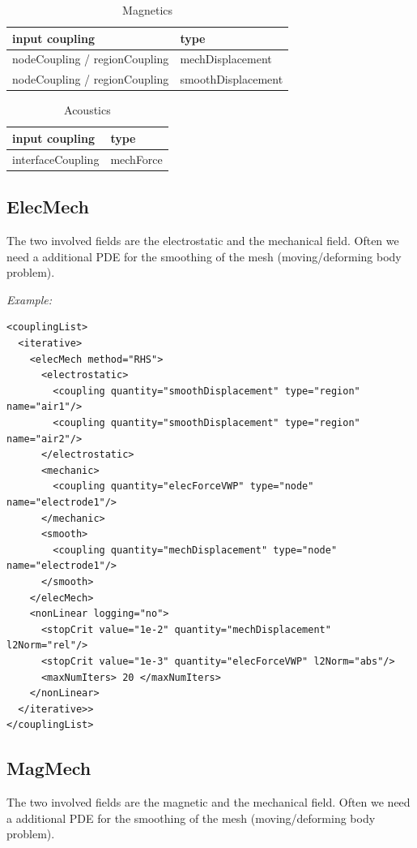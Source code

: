 \begin{table}[htb]
\begin{center}
\caption{Magnetics}
\bigskip
\begin{tabular}{l|l}
input coupling    & type \\\hline \hline
nodeCoupling / regionCoupling & mechDisplacement \\
nodeCoupling / regionCoupling & smoothDisplacement 
\end{tabular}
\end{center}
\end{table}

\begin{table}[htb]
\begin{center}
\caption{Acoustics}
\bigskip
\begin{tabular}{l|l}
input coupling    & type \\\hline \hline
interfaceCoupling      & mechForce \\
\end{tabular}
\end{center}
\end{table}

\subsection{ElecMech}
The two involved fields are the electrostatic and the mechanical field.
Often we need a additional PDE for the smoothing of the mesh (moving/deforming 
body problem).

\bigskip
\noindent
{\it Example:}

\begin{verbatim}
<couplingList>
  <iterative>
    <elecMech method="RHS">
      <electrostatic>
        <coupling quantity="smoothDisplacement" type="region" name="air1"/>
        <coupling quantity="smoothDisplacement" type="region" name="air2"/>
      </electrostatic>
      <mechanic>
        <coupling quantity="elecForceVWP" type="node" name="electrode1"/>
      </mechanic>
      <smooth>
        <coupling quantity="mechDisplacement" type="node" name="electrode1"/>
      </smooth>
    </elecMech>
    <nonLinear logging="no">
      <stopCrit value="1e-2" quantity="mechDisplacement" l2Norm="rel"/>
      <stopCrit value="1e-3" quantity="elecForceVWP" l2Norm="abs"/>
      <maxNumIters> 20 </maxNumIters>
    </nonLinear>
  </iterative>>
</couplingList>
\end{verbatim}

\subsection{MagMech}
The two involved fields are the magnetic and the mechanical field.
Often we need a additional PDE for the smoothing of the mesh (moving/deforming 
body problem).

